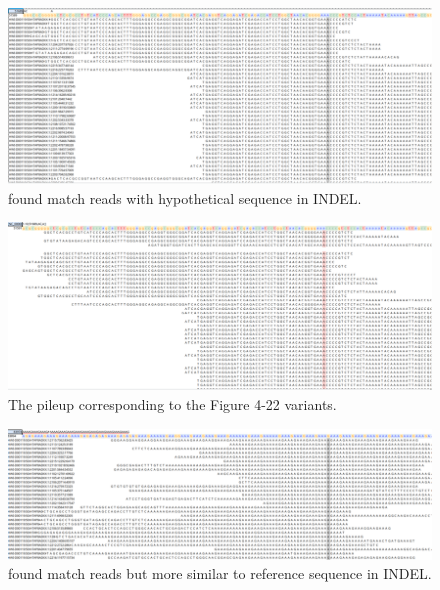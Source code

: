 \vspace{1cm}
\begin{figure}[H]
    \centering
    \includegraphics[width=1\columnwidth]{body/image/4-22.png}
    \captionsetup{labelfont=bf}
    \renewcommand{\baselinestretch}{1.0}
    \vspace{-1cm}
    \caption[INDEL match reads]{ found match reads with hypothetical sequence in INDEL.}
    \label{f4-22}
\end{figure}

\vspace{0.5cm}
\begin{figure}[H]
    \centering
    \includegraphics[width=1\columnwidth]{body/image/4-23.png}
    \captionsetup{labelfont=bf}
    \renewcommand{\baselinestretch}{1.0}
    \vspace{-1cm}
    \caption[Figure 4.22 pileup]{ The pileup corresponding to the Figure 4-22 variants.}
    \label{f4-23}
\end{figure}

\begin{figure}[H]
    \centering
    \includegraphics[width=1\columnwidth]{body/image/4-24.png}
    \captionsetup{labelfont=bf}
    \renewcommand{\baselinestretch}{1.0}
    \vspace{-1cm}
    \caption[INDEL worse match reads]{ found match reads but more similar to reference sequence in INDEL.}
    \label{f4-24}
\end{figure}

